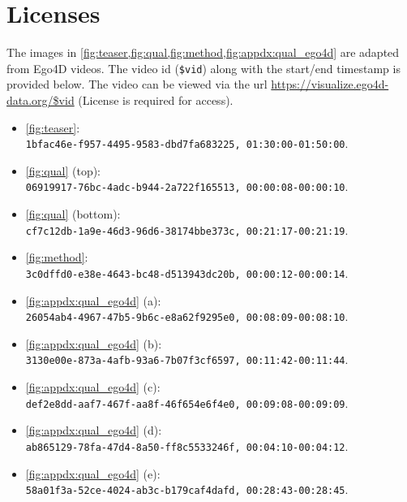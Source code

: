 \documentclass[10pt,twocolumn,letterpaper]{article}
\begin{document}
\section{Licenses}
The images in \cref{fig:teaser,fig:qual,fig:method,fig:appdx:qual_ego4d} are adapted from Ego4D videos.
The video id (\texttt{\$vid}) along with the start/end timestamp is provided below.
The video can be viewed via the url \url{https://visualize.ego4d-data.org/$vid} (License is required for access).
\begin{itemize}
	\item \cref{fig:teaser}: \\ \texttt{1bfac46e-f957-4495-9583-dbd7fa683225, 01:30:00-01:50:00}.
	\item \cref{fig:qual} (top): \\ \texttt{06919917-76bc-4adc-b944-2a722f165513, 00:00:08-00:00:10}.
	\item \cref{fig:qual} (bottom): \\ \texttt{cf7c12db-1a9e-46d3-96d6-38174bbe373c, 00:21:17-00:21:19}.
	\item \cref{fig:method}: \\ \texttt{3c0dffd0-e38e-4643-bc48-d513943dc20b, 00:00:12-00:00:14}.
	\item \cref{fig:appdx:qual_ego4d} (a): \\ \texttt{26054ab4-4967-47b5-9b6c-e8a62f9295e0, 00:08:09-00:08:10}.
	\item \cref{fig:appdx:qual_ego4d} (b): \\ \texttt{3130e00e-873a-4afb-93a6-7b07f3cf6597, 00:11:42-00:11:44}.
	\item \cref{fig:appdx:qual_ego4d} (c): \\ \texttt{def2e8dd-aaf7-467f-aa8f-46f654e6f4e0, 00:09:08-00:09:09}.
	\item \cref{fig:appdx:qual_ego4d} (d): \\ \texttt{ab865129-78fa-47d4-8a50-ff8c5533246f, 00:04:10-00:04:12}.
	\item \cref{fig:appdx:qual_ego4d} (e): \\ \texttt{58a01f3a-52ce-4024-ab3c-b179caf4dafd, 00:28:43-00:28:45}.
\end{itemize}

 
\end{document}
